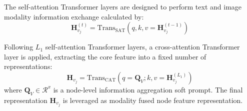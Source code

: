 


The self-attention Transformer layers are designed to perform text and image modality information exchange calculated by:
\begin{equation}
\mathbf{H}^{(t)}_{v_j} = \text{Trans}_{\text{SAT}} \left( q, k, v=\mathbf{H}^{(t-1)}_{v_j} \right)
\end{equation}

Following $L_1$ self-attention Transformer layers, a cross-attention Transformer layer is applied, extracting the core feature into a fixed number of representations:
\begin{equation}
\mathbf{H}_{v_j} = \text{Trans}_{\text{CAT}} \left(q=\bm{Q}_V; k, v=\mathbf{H}^{(L_1)}_{v_j} \right)
\end{equation}
where $\bm{Q}_V\in \mathcal{R}^x$ is a node-level information aggregation soft prompt. The final representation $\mathbf{H}_{v_j}$ is leveraged as modality fused node feature representation.





